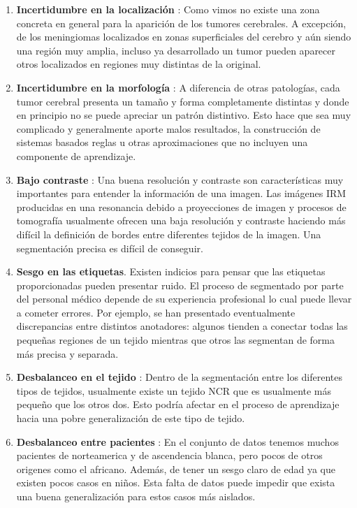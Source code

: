 \begin{enumerate}
	\item \textbf{Incertidumbre en la localización} : Como vimos no existe una zona concreta en general para la aparición de los tumores cerebrales. A excepción, de los meningiomas localizados en zonas superficiales del cerebro y aún siendo una región muy amplia, incluso ya desarrollado un tumor pueden aparecer otros localizados en regiones muy distintas de la original. 
	\item \textbf{Incertidumbre en la morfología} : A diferencia de otras patologías, cada tumor cerebral presenta un tamaño y forma completamente distintas y donde en principio no se puede apreciar un patrón distintivo. Esto hace que sea muy complicado y generalmente aporte malos resultados, la construcción de sistemas basados reglas u otras aproximaciones que no incluyen una componente de aprendizaje.
	
	\item \textbf{Bajo contraste} : Una buena resolución y contraste son características muy importantes para entender la información de una imagen. Las imágenes IRM producidas en una resonancia debido a proyecciones de imagen y procesos de tomografía usualmente ofrecen una baja resolución y contraste haciendo más difícil la definición de bordes entre diferentes tejidos de la imagen. Una segmentación precisa es difícil de conseguir.
	
	\item \textbf{Sesgo en las etiquetas}. Existen indicios para pensar que las etiquetas proporcionadas pueden presentar ruido. El proceso de segmentado por parte del personal médico 
	depende de su experiencia profesional lo cual puede llevar a cometer errores. Por ejemplo, se han presentado eventualmente discrepancias entre distintos anotadores: algunos tienden a conectar todas las pequeñas regiones de un tejido mientras que otros las segmentan de forma más precisa y separada. 
	
	\item \textbf{Desbalanceo en el tejido} : Dentro de la segmentación entre los diferentes tipos de tejidos, usualmente existe un tejido NCR que es usualmente más pequeño que los otros dos. 
	Esto podría afectar en el proceso de aprendizaje hacia una pobre generalización de este tipo de tejido. 
	
	\item \textbf{Desbalanceo entre pacientes} : En el conjunto de datos tenemos muchos pacientes de norteamerica y de ascendencia blanca, pero pocos de otros origenes como el africano. Además, de tener un sesgo claro de edad ya que existen pocos casos en niños. Esta falta de datos puede impedir que exista una buena generalización para estos casos más aislados.
	
\end{enumerate}



